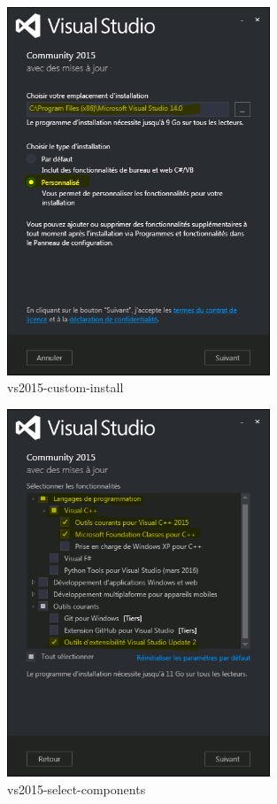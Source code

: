 \documentclass[10pt,a4paper]{article}
\begin{document}
\newline
\begin{figure}[!htbp]
  \center
  \includegraphics[width=0.7\textwidth]{Art/vs2015-custom-install.png}
  \caption[]{vs2015-custom-install}
  \label{fig:vs2015-custom-install}
\end{figure}

\begin{figure}[!htbp]
  \center
  \includegraphics[width=0.7\textwidth]{Art/vs2015-select-components.png}
  \caption[]{vs2015-select-components}
  \label{fig:vs2015-select-components}
\end{figure}
\end{document}
